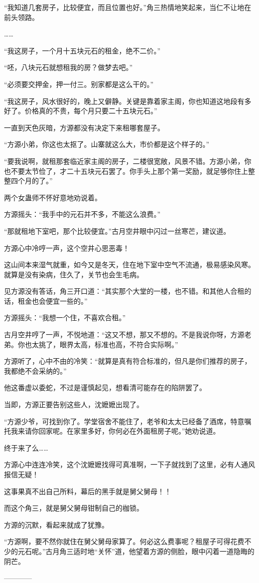 \begin{this_body}
“我知道几套房子，比较便宜，而且位置也好。”角三热情地笑起来，当仁不让地在前头领路。

……

“我这房子，一个月十五块元石的租金，绝不二价。”

“呸，八块元石就想租我的房？做梦去吧。”

“必须要交押金，押一付三。别家都是这么干的。”

“我这房子，风水很好的，晚上又僻静。关键是靠着家主阁，你也知道这地段有多好了。价格真的不贵，每个月只要二十五块元石。”

一直到天色灰暗，方源都没有决定下来租哪套屋子。

“方源小弟，你这也太抠了。山寨就这么大，市价都是这个样子的。”

“要我说啊，就租那套临近家主阁的房子，二楼很宽敞，风景不错。方源小弟，你也不要太节俭了，才二十五块元石罢了。你手头上那个第一奖励，就足够你住上整整四个月的了。”

两个女蛊师不怀好意地劝说着。

方源摇头：“我手中的元石并不多，不能这么浪费。”

“那就租地下室吧，那个比较便宜。”古月空井眼中闪过一丝寒芒，建议道。

方源心中冷哼一声，这个空井心思恶毒！

这山间本来湿气就重，如今又是冬天，住在地下室中空气不流通，极易感染风寒。就算是没有染病，住久了，关节也会生毛病。

见方源没有答话，角三开口道：“其实那个大堂的一楼，也不错。和其他人合租的话，租金也会便宜一些的。”

方源摇头：“我想一个住，不喜欢合租。”

古月空井哼了一声，不悦地道：“这又不想，那又不想的。不是我说你呀，方源老弟。你也太挑了，眼界太高，标准也高，不符合实际啊。”

方源听了，心中不由的冷笑：“就算是真有符合标准的，但凡是你们推荐的房子，我都绝不会采纳的。”

他这番虚以委蛇，不过是谨慎起见，想看清可能存在的陷阱罢了。

当即，方源正要告别这些人，沈嬷嬷出现了。

“方源少爷，可找到你了。学堂宿舍不能住了，老爷和太太已经备了酒席，特意嘱托我来请你回家呢。在家里多好，你何必在外面租房子呢。”她劝说道。

终于来了么……

方源心中连连冷笑，这个沈嬷嬷找得可真准啊，一下子就找到了这里，必有人通风报信无疑！

这事果真不出自己所料，幕后的黑手就是舅父舅母！！

而这个角三，就是舅父舅母钳制自己的枷锁。

方源的沉默，看起来就成了犹豫。

“方源啊，要不然你就住在舅父舅母家算了。何必这么费事呢？租屋子可得花费不少的元石呢。”古月角三适时地“关怀”道，他望着方源的侧脸，眼中闪着一道隐晦的阴芒。

------------

\end{this_body}

